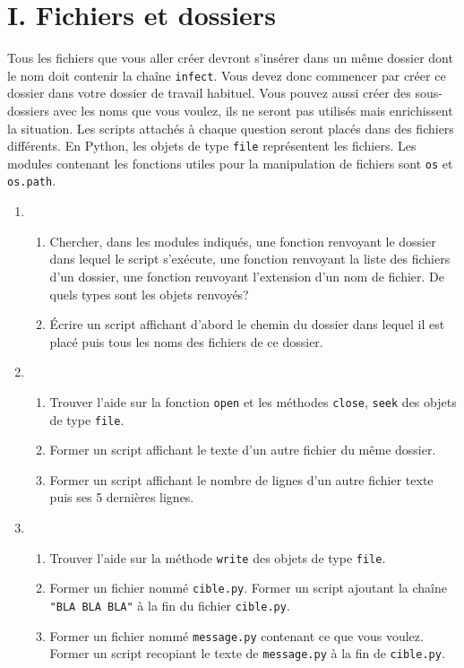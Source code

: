 \section*{I. Fichiers et dossiers}
Tous les fichiers que vous aller créer devront s'insérer dans un même dossier dont le nom doit contenir la chaîne \verb|infect|. Vous devez donc commencer par créer ce dossier dans votre dossier de travail habituel. Vous pouvez aussi créer des sous-dossiers avec les noms que vous voulez, ils ne seront pas utilisés mais enrichissent la situation.\newline 
 Les scripts attachés à chaque question seront placés dans des fichiers différents.\newline
En Python, les objets de type \verb|file| représentent les fichiers. Les modules contenant les fonctions utiles pour la manipulation de fichiers sont \verb|os| et \verb|os.path|.
\begin{enumerate}
  \item
\begin{enumerate}
\item Chercher, dans les modules indiqués, une fonction renvoyant le dossier dans lequel le script s'exécute, une fonction renvoyant la liste des fichiers d'un dossier, une fonction renvoyant l'extension d'un nom de fichier. De quels types sont les objets renvoyés?
\item \'Ecrire un script affichant d'abord le chemin du dossier dans lequel il est placé puis tous les noms des fichiers de ce dossier.
\end{enumerate}
\item
\begin{enumerate}
  \item Trouver l'aide sur la fonction \verb|open| et les méthodes \verb|close|, \verb|seek| des objets de type \verb|file|.
  \item Former un script affichant le texte d'un autre fichier du même dossier.
  \item Former un script affichant le nombre de lignes d'un autre fichier texte puis ses 5 dernières lignes.
\end{enumerate}
\item
\begin{enumerate}
  \item Trouver l'aide sur la méthode \verb|write| des objets de type \verb|file|.
  \item Former un fichier nommé \verb|cible.py|. Former un script ajoutant la chaîne \verb|"BLA BLA BLA"| à la fin du fichier \verb|cible.py|.
  \item Former un fichier nommé \verb|message.py| contenant ce que vous voulez. Former un script recopiant le texte de \verb|message.py| à la fin de \verb|cible.py|. 
\end{enumerate}

\end{enumerate}

